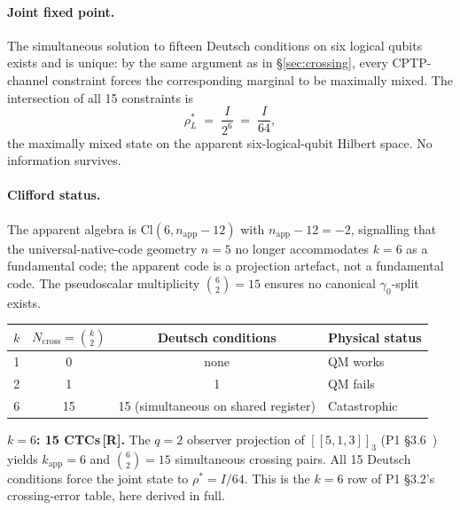 \documentclass[11pt,a4paper]{article}
\newcommand{\Rmark}{\textcolor{green!50!black}{\textbf{[R]}}}
\newcommand{\Cq}[4]{[\![#1,#2,#3]\!]_{#4}}
\providecommand{\Cl}[1]{\mathrm{Cl}(#1)}
\newcommand{\kApp}{k_{\mathrm{app}}}
\begin{document}
\paragraph{Joint fixed point.}
The simultaneous solution to fifteen Deutsch conditions on six logical qubits exists and is unique: by the same argument as in \S\ref{sec:crossing}, every CPTP-channel constraint forces the corresponding marginal to be maximally mixed. The intersection of all 15 constraints is
\begin{equation}
  \rho_L^* \;=\; \frac{I}{2^6} \;=\; \frac{I}{64},
  \label{eq:rho_L_k6}
\end{equation}
the maximally mixed state on the apparent six-logical-qubit Hilbert space. No information survives.

\paragraph{Clifford status.}
The apparent algebra is $\Cl{6,n_{\mathrm{app}}-12}$ with $n_{\mathrm{app}}-12=-2$, signalling that the universal-native-code geometry $n=5$ no longer accommodates $k=6$ as a fundamental code; the apparent code is a projection artefact, not a fundamental code. The pseudoscalar multiplicity $\binom{6}{2}=15$ ensures no canonical $\gamma_0$-split exists.

\begin{center}
\renewcommand{\arraystretch}{1.25}
\begin{tabular}{cccl}
\toprule
$k$ & $N_{\mathrm{cross}}=\binom{k}{2}$ & Deutsch conditions & Physical status \\
\midrule
1 & 0  & none                                 & QM works \\
2 & 1  & 1                                    & QM fails \\
6 & 15 & 15 (simultaneous on shared register) & Catastrophic \\
\bottomrule
\end{tabular}
\end{center}

\begin{mdframed}[backgroundcolor=Rbg,linecolor=Rcolor,linewidth=1.5pt]
\textbf{$k=6$: 15 CTCs\,\Rmark.}\quad
The $q=2$ observer projection of $\Cq{5}{1}{3}{3}$ (P1 \S3.6~\cite{Hubka2026QSD}) yields $\kApp=6$ and $\binom{6}{2}=15$ simultaneous crossing pairs. All 15 Deutsch conditions force the joint state to $\rho^*=I/64$. This is the $k=6$ row of P1 \S3.2's crossing-error table, here derived in full.
\end{mdframed}
\end{document}

